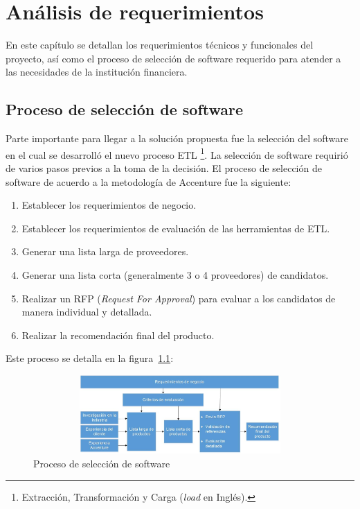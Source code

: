 \chapter{Análisis de requerimientos}
\label{cap:analisis}

En este capítulo se detallan los requerimientos técnicos y funcionales del proyecto, así como el proceso de selección de software requerido para atender a las necesidades de la institución financiera.

\section{Proceso de selección de software}

Parte importante para llegar a la solución propuesta fue la selección del
software en el cual se desarrolló el nuevo proceso ETL \footnote{Extracción,
  Transformación y Carga (\emph{load} en Inglés).}. La selección de software
requirió de varios pasos previos a la toma de la decisión. El proceso de
selección de software de acuerdo a la metodología de Accenture fue la siguiente:

\begin{enumerate}
\item Establecer los requerimientos de negocio.
\item Establecer los requerimientos de evaluación de las herramientas de ETL.
\item Generar una lista larga de proveedores.
\item Generar una lista corta (generalmente 3 o 4 proveedores) de candidatos.
\item Realizar un RFP (\emph{Request For Approval}) para evaluar a los
  candidatos de manera individual y detallada.
\item Realizar la recomendación final del producto.
\end{enumerate}

Este proceso se detalla en la figura~\ref{fig:proceso}:

\begin{figure}[htb]
  \begin{center}
    \includegraphics[width=12cm, height=3cm, scale=0.5]{Proceso_seleccion_software.jpg}
    \caption{Proceso de selección de software}
    \label{fig:proceso}
  \end{center}
\end{figure}

